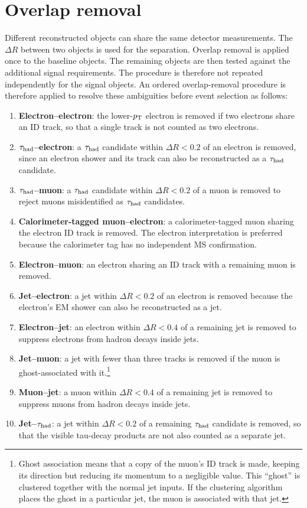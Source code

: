 \section{Overlap removal}
\label{sec:ch6_overlap}

Different reconstructed objects can share the same detector measurements. The $\Delta R$ between two objects is used for the separation.
Overlap removal is applied once to the baseline objects. The remaining objects are then tested against the additional signal requirements. The procedure is therefore not repeated independently for the signal objects.
An ordered overlap-removal procedure is therefore applied to resolve these ambiguities before event selection as follows:
\begin{enumerate}
    \item \textbf{Electron--electron}: the lower-$p_{\mathrm{T}}$ electron is removed if two electrons share an ID track, so that a single track is not counted as two electrons.
    \item \textbf{$\tau_{\mathrm{had}}$--electron}: a $\tau_{\mathrm{had}}$ candidate within $\Delta R<0.2$ of an electron is removed, since an electron shower and its track can also be reconstructed as a $\tau_{\mathrm{had}}$ candidate.
    \item \textbf{$\tau_{\mathrm{had}}$--muon}: a $\tau_{\mathrm{had}}$ candidate within $\Delta R<0.2$ of a muon is removed to reject muons misidentified as $\tau_{\mathrm{had}}$ candidates.
    \item \textbf{Calorimeter-tagged muon--electron}: a calorimeter-tagged muon sharing the electron ID track is removed. The electron interpretation is preferred because the calorimeter tag has no independent MS confirmation.
    \item \textbf{Electron--muon}: an electron sharing an ID track with a remaining muon is removed.
    \item \textbf{Jet--electron}: a jet within $\Delta R<0.2$ of an electron is removed because the electron's EM shower can also be reconstructed as a jet.
    \item \textbf{Electron--jet}: an electron within $\Delta R<0.4$ of a remaining jet is removed to suppress electrons from hadron decays inside jets.
    \item \textbf{Jet--muon}: a jet with fewer than three tracks is removed if the muon is ghost-associated with it.\footnote{Ghost association means that a copy of the muon's ID track is made, keeping its direction but reducing its momentum to a negligible value. This ``ghost'' is clustered together with the normal jet inputs. If the clustering algorithm places the ghost in a particular jet, the muon is associated with that jet.}
    \item \textbf{Muon--jet}: a muon within $\Delta R<0.4$ of a remaining jet is removed to suppress muons from hadron decays inside jets.
    \item \textbf{Jet--$\tau_{\mathrm{had}}$}: a jet within $\Delta R<0.2$ of a remaining $\tau_{\mathrm{had}}$ candidate is removed, so that the visible tau-decay products are not also counted as a separate jet.
\end{enumerate}
